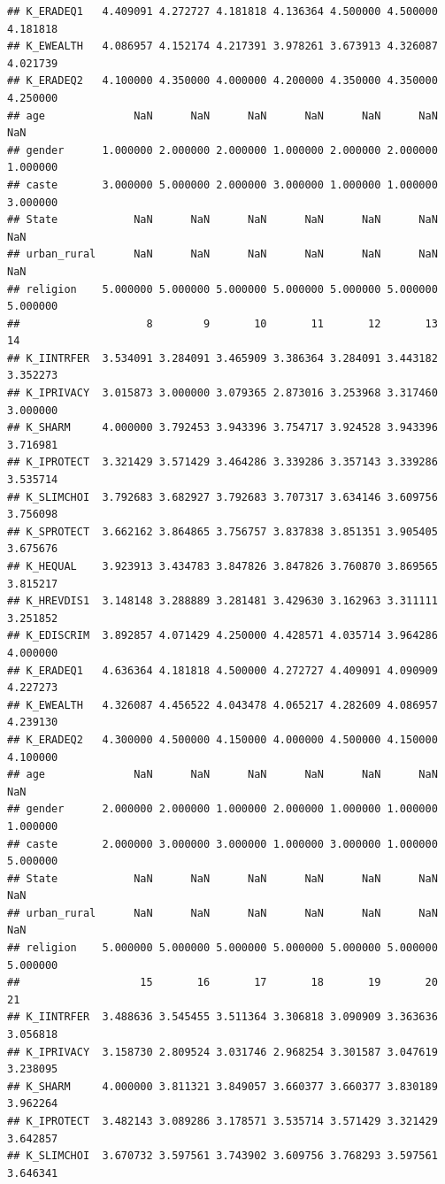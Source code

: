 \documentclass[
]{article}
\begin{document}
\begin{verbatim}
## K_ERADEQ1   4.409091 4.272727 4.181818 4.136364 4.500000 4.500000 4.181818
## K_EWEALTH   4.086957 4.152174 4.217391 3.978261 3.673913 4.326087 4.021739
## K_ERADEQ2   4.100000 4.350000 4.000000 4.200000 4.350000 4.350000 4.250000
## age              NaN      NaN      NaN      NaN      NaN      NaN      NaN
## gender      1.000000 2.000000 2.000000 1.000000 2.000000 2.000000 1.000000
## caste       3.000000 5.000000 2.000000 3.000000 1.000000 1.000000 3.000000
## State            NaN      NaN      NaN      NaN      NaN      NaN      NaN
## urban_rural      NaN      NaN      NaN      NaN      NaN      NaN      NaN
## religion    5.000000 5.000000 5.000000 5.000000 5.000000 5.000000 5.000000
##                    8        9       10       11       12       13       14
## K_IINTRFER  3.534091 3.284091 3.465909 3.386364 3.284091 3.443182 3.352273
## K_IPRIVACY  3.015873 3.000000 3.079365 2.873016 3.253968 3.317460 3.000000
## K_SHARM     4.000000 3.792453 3.943396 3.754717 3.924528 3.943396 3.716981
## K_IPROTECT  3.321429 3.571429 3.464286 3.339286 3.357143 3.339286 3.535714
## K_SLIMCHOI  3.792683 3.682927 3.792683 3.707317 3.634146 3.609756 3.756098
## K_SPROTECT  3.662162 3.864865 3.756757 3.837838 3.851351 3.905405 3.675676
## K_HEQUAL    3.923913 3.434783 3.847826 3.847826 3.760870 3.869565 3.815217
## K_HREVDIS1  3.148148 3.288889 3.281481 3.429630 3.162963 3.311111 3.251852
## K_EDISCRIM  3.892857 4.071429 4.250000 4.428571 4.035714 3.964286 4.000000
## K_ERADEQ1   4.636364 4.181818 4.500000 4.272727 4.409091 4.090909 4.227273
## K_EWEALTH   4.326087 4.456522 4.043478 4.065217 4.282609 4.086957 4.239130
## K_ERADEQ2   4.300000 4.500000 4.150000 4.000000 4.500000 4.150000 4.100000
## age              NaN      NaN      NaN      NaN      NaN      NaN      NaN
## gender      2.000000 2.000000 1.000000 2.000000 1.000000 1.000000 1.000000
## caste       2.000000 3.000000 3.000000 1.000000 3.000000 1.000000 5.000000
## State            NaN      NaN      NaN      NaN      NaN      NaN      NaN
## urban_rural      NaN      NaN      NaN      NaN      NaN      NaN      NaN
## religion    5.000000 5.000000 5.000000 5.000000 5.000000 5.000000 5.000000
##                   15       16       17       18       19       20       21
## K_IINTRFER  3.488636 3.545455 3.511364 3.306818 3.090909 3.363636 3.056818
## K_IPRIVACY  3.158730 2.809524 3.031746 2.968254 3.301587 3.047619 3.238095
## K_SHARM     4.000000 3.811321 3.849057 3.660377 3.660377 3.830189 3.962264
## K_IPROTECT  3.482143 3.089286 3.178571 3.535714 3.571429 3.321429 3.642857
## K_SLIMCHOI  3.670732 3.597561 3.743902 3.609756 3.768293 3.597561 3.646341

\end{verbatim}
\end{document}

